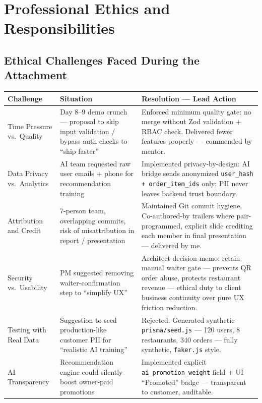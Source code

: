 \chapter{Professional Ethics and Responsibilities}
\label{ch:ethics}

\section{Ethical Challenges Faced During the Attachment}

\begin{center}
\label{tab:ethical}
\begin{xltabular}{\textwidth}{@{}p{0.22\textwidth}p{0.34\textwidth}X@{}}
\toprule
\textbf{Challenge} & \textbf{Situation} & \textbf{Resolution --- Lead Action} \\
\midrule
Time Pressure vs.\ Quality & Day 8--9 demo crunch --- proposal to skip input validation / bypass auth checks to ``ship faster'' & Enforced minimum quality gate: no merge without Zod validation + RBAC check. Delivered fewer features properly --- commended by mentor. \\
Data Privacy vs.\ Analytics & AI team requested raw user emails + phone for recommendation training & Implemented privacy-by-design: AI bridge sends anonymized \texttt{user\_hash + order\_item\_ids} only; PII never leaves backend trust boundary. \\
Attribution and Credit & 7-person team, overlapping commits, risk of misattribution in report / presentation & Maintained Git commit hygiene, Co-authored-by trailers where pair-programmed, explicit slide crediting each member in final presentation --- delivered by me. \\
Security vs.\ Usability & PM suggested removing waiter-confirmation step to ``simplify UX'' & Architect decision memo: retain manual waiter gate --- prevents QR order abuse, protects restaurant revenue --- ethical duty to client business continuity over pure UX friction reduction. \\
Testing with Real Data & Suggestion to seed production-like customer PII for ``realistic AI training'' & Rejected. Generated synthetic \texttt{prisma/seed.js} --- 120 users, 8 restaurants, 340 orders --- fully synthetic, \texttt{faker.js} style. \\
AI Transparency & Recommendation engine could silently boost owner-paid promotions & Implemented explicit \texttt{ai\_promotion\_weight} field + UI ``Promoted'' badge --- transparent to customer, auditable. \\

\end{xltabular}
\end{center}
